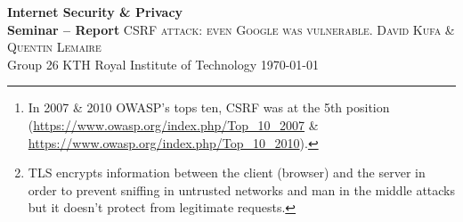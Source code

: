\documentclass[a4paper,11pt,openany]{report}
\newcommand{\csrf}{\textit{Cross-Site Request Forgery}}
\begin{document}
 \begin{titlepage}
  \centering
  \vfill
    {\bfseries\Large{
	Internet Security \& Privacy\\
	Seminar -- Report}
    }    
  \vfill
  \vfill
    \Huge{\textsc{CSRF attack: even Google was vulnerable.}}
  \vfill
      \Large{\textsc{David Kufa} \& \textsc{Quentin Lemaire}}
    \\
  \vspace{0.4cm}
    Group 26
  \vfill
  \vfill
    KTH Royal Institute of Technology
  \vfill
    \today
\end{titlepage}

\begin{abstract}
  \csrf{} (CSRF) -- often spelled ``sea surf'' -- is a well-known web attack which has 
  been discovered in 2001. The \textit{Open Web Application Security Project} (OWASP \cite{owasp}) 
  ranked CSRF as the 8th\footnote{In 2007 \& 2010 OWASP's tops ten, CSRF was at the 5th position 
  (\url{https://www.owasp.org/index.php/Top_10_2007} \& \url{https://www.owasp.org/index.php/Top_10_2010}).} 
  vulnerability in the top 10 of the most critical web application security risks in 2013~\cite{owasp_top_ten}.
  
  CSRF attacks consists of creating (forging) fake HTTP or HTTPS\footnote{TLS encrypts 
  information between the client (browser) and the server in order to prevent sniffing 
  in untrusted networks and man in the middle attacks but it doesn't protect from 
  legitimate requests.} requests on the user's behalf. It utilizes the lack of knowledge 
  of the victim to build the request and get information with their credentials (as if 
  the user really wanted to execute this request). In order to succeed, the victim must 
  be connected (authenticated) to the service (website) where the vulnerability is located. 
  Then, an attacker will have to fool the victim in order to build the fake request (with 
  social engineering for instance).
  
  During this seminar we wanted to get a better understanding of the security breaches 
  involved in CSRF attack. Our first and most interesting part was the comprehension of 
  the surface of an attack: how can it be done and where does it come from. It 
  was also important to understand what kind of information an attacker could steal or 
  affect on the user's behalf thanks to this attack. Furthermore, it was relevant to study 
  different ways of detecting the vulnerability and how to protect web servers from this 
  attack.
  

\end{abstract}
\end{document}
